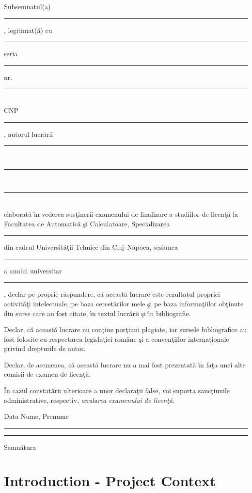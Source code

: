 \documentclass[12pt,a4paper,twoside]{report}
\newcommand{\uline}[1]{\rule[0pt]{#1}{0.4pt}}
\begin{document}
Subsemnatul(a) \\
\uline{14.8cm}, 
legitimat(\u{a}) cu \uline{4cm} seria \uline{3cm} nr. \uline{4cm}\\
CNP \uline{9cm}, autorul lucr\u{a}rii \uline{2.8cm}\\
\uline{16cm}\\
\uline{16cm}\\
elaborat\u{a} \^{\i}n vederea sus\c{t}inerii examenului de finalizare a studiilor de licen\c{t}\u{a} la Facultatea de Automatic\u{a} \c{s}i Calculatoare, Specializarea \uline{7cm} din cadrul Universit\u{a}\c{t}ii Tehnice din Cluj-Napoca, sesiunea \uline{4cm} a anului universitar \uline{3cm}, declar pe proprie r\u{a}spundere, c\u{a} aceast\u{a} lucrare este rezultatul propriei activit\u{a}\c{t}i intelectuale, pe baza cercet\u{a}rilor mele \c{s}i pe baza informa\c{t}iilor ob\c{t}inute din surse care au fost citate, \^{\i}n textul lucr\u{a}rii \c{s}i \^{\i}n bibliografie.

Declar, c\u{a} aceast\u{a} lucrare nu con\c{t}ine por\c{t}iuni plagiate, iar sursele bibliografice au fost folosite cu 
respectarea legisla\c{t}iei rom\^{a}ne \c{s}i a conven\c{t}iilor interna\c{t}ionale privind drepturile de autor.

Declar, de asemenea, c\u{a} aceast\u{a} lucrare nu a mai fost prezentat\u{a} \^{\i}n fa\c{t}a unei alte comisii de examen de licen\c{t}\u{a}.

\^{I}n cazul constat\u{a}rii ulterioare a unor declara\c{t}ii false, voi suporta sanc\c{t}iunile administrative, respectiv, \emph{anularea examenului de licen\c{t}\u{a}}.

\vspace{1.5cm}

Data \hspace{8cm} Nume, Prenume

\vspace{0.5cm}

\uline{3cm} \hspace{5cm} \uline{5cm}

\vspace{0.5cm}
\hspace{9.4cm}Semn\u{a}tura

\thispagestyle{empty}

\newpage

\tableofcontents
\newpage

\setcounter{page}{1}


\chapter{Introduction - Project Context}
\pagestyle{headings}
\end{document}
